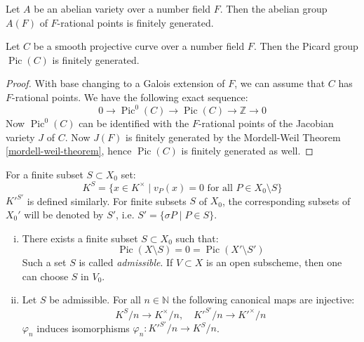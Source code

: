 \begin{theorem}\label{mordell-weil-theorem}
Let $A$ be an abelian variety over a number field $F$. Then the abelian group $A(F)$ of $F$-rational points is finitely generated.
\end{theorem}

\begin{corollary}\label{mordell-weil-corollary}
Let $C$ be a smooth projective curve over a number field $F$. Then the Picard group $\operatorname{Pic}(C)$ is finitely generated.
\end{corollary}

\begin{proof}
With base changing to a Galois extension of $F$, we can assume that $C$ has $F$-rational points. We have the following exact sequence:
\[ 0\longrightarrow \operatorname{Pic}^0(C) \longrightarrow\operatorname{Pic}(C) \longrightarrow \mathbb{Z} \longrightarrow 0  \]
Now $\operatorname{Pic}^0(C)$ can be identified with the $F$-rational points of the Jacobian variety $J$ of $C$. Now $J(F)$ is finitely generated by the Mordell-Weil Theorem \ref{mordell-weil-theorem}, hence $\operatorname{Pic}(C)$ is finitely generated as well.
\end{proof}

\begin{definition}\label{4.4}
For a finite subset $S\subset X_0$ set:
\[ K^S=\{x\in K^\times \mid v_P(x)=0\text{ for all }P\in X_0\setminus S \} \]
$K'^{S'}$ is defined similarly. For finite subsets $S$ of $X_0$, the corresponding subsets of $X_0'$ will be denoted by $S'$, i.e. $S'=\{\sigma P\mid P\in S \} $.
\end{definition}

\begin{lemma}\label{4.5}
\begin{enumerate}[(i)]
\item There exists a finite subset $S\subset X_0$ such that:
\[ \operatorname{Pic}(X\setminus S)=0=\operatorname{Pic}(X'\setminus S') \]
Such a set $S$ is called \textit{admissible}. If $V\subset X$ is an open subscheme, then one can choose $S$ in $V_0$.
\item Let $S$ be admissible. For all $n\in\mathbb{N}$ the following canonical maps are injective:
\[ K^S/n \to K^\times /n,\quad K'^{S'}/n\to K'^\times /n \]
$\varphi_n$ induces isomorphisms $\varphi_n: K'^{S'}/n\to K^S/n$.
\end{enumerate}
\end{lemma}

